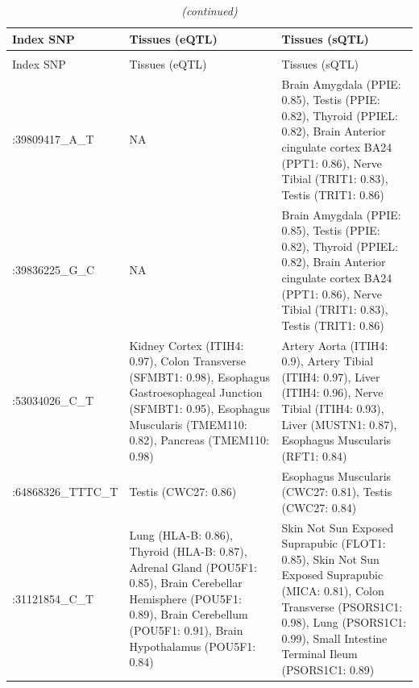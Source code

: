 \begin{longtable}[t]{l>{\raggedright\arraybackslash}p{10em}>{\raggedright\arraybackslash}p{10em}}
  \caption{shows}
    \label{table:coloc_res}\\
    \hline
  \toprule
  Index SNP & Tissues (eQTL) & Tissues (sQTL)\\
  \midrule
  \endfirsthead
  \caption[]{ \textit{(continued)}}\\
  \toprule
  Index SNP & Tissues (eQTL) & Tissues (sQTL)\\
  \midrule
  \endhead
  
  \endfoot
  \bottomrule
  \endlastfoot
  \begingroup\fontsize{9}{11}\selectfont 1:39809417\_A\_T\endgroup & \begingroup\fontsize{9}{11}\selectfont NA\endgroup & \begingroup\fontsize{9}{11}\selectfont Brain Amygdala (PPIE: 0.85), Testis (PPIE: 0.82), Thyroid (PPIEL: 0.82), Brain Anterior cingulate cortex BA24 (PPT1: 0.86), Nerve Tibial (TRIT1: 0.83), Testis (TRIT1: 0.86)\endgroup\\
  \midrule
  \begingroup\fontsize{9}{11}\selectfont 1:39836225\_G\_C\endgroup & \begingroup\fontsize{9}{11}\selectfont NA\endgroup & \begingroup\fontsize{9}{11}\selectfont Brain Amygdala (PPIE: 0.85), Testis (PPIE: 0.82), Thyroid (PPIEL: 0.82), Brain Anterior cingulate cortex BA24 (PPT1: 0.86), Nerve Tibial (TRIT1: 0.83), Testis (TRIT1: 0.86)\endgroup\\
  \midrule
  \begingroup\fontsize{9}{11}\selectfont 3:53034026\_C\_T\endgroup & \begingroup\fontsize{9}{11}\selectfont Kidney Cortex (ITIH4: 0.97), Colon Transverse (SFMBT1: 0.98), Esophagus Gastroesophageal Junction (SFMBT1: 0.95), Esophagus Muscularis (TMEM110: 0.82), Pancreas (TMEM110: 0.98)\endgroup & \begingroup\fontsize{9}{11}\selectfont Artery Aorta (ITIH4: 0.9), Artery Tibial (ITIH4: 0.97), Liver (ITIH4: 0.96), Nerve Tibial (ITIH4: 0.93), Liver (MUSTN1: 0.87), Esophagus Muscularis (RFT1: 0.84)\endgroup\\
  \midrule
  \begingroup\fontsize{9}{11}\selectfont 5:64868326\_TTTC\_T\endgroup & \begingroup\fontsize{9}{11}\selectfont Testis (CWC27: 0.86)\endgroup & \begingroup\fontsize{9}{11}\selectfont Esophagus Muscularis (CWC27: 0.81), Testis (CWC27: 0.84)\endgroup\\
  \midrule
  \begingroup\fontsize{9}{11}\selectfont 6:31121854\_C\_T\endgroup & \begingroup\fontsize{9}{11}\selectfont Lung (HLA-B: 0.86), Thyroid (HLA-B: 0.87), Adrenal Gland (POU5F1: 0.85), Brain Cerebellar Hemisphere (POU5F1: 0.89), Brain Cerebellum (POU5F1: 0.91), Brain Hypothalamus (POU5F1: 0.84)\endgroup & \begingroup\fontsize{9}{11}\selectfont Skin Not Sun Exposed Suprapubic (FLOT1: 0.85), Skin Not Sun Exposed Suprapubic (MICA: 0.81), Colon Transverse (PSORS1C1: 0.98), Lung (PSORS1C1: 0.99), Small Intestine Terminal Ileum (PSORS1C1: 0.89)\endgroup\\

\end{longtable}
